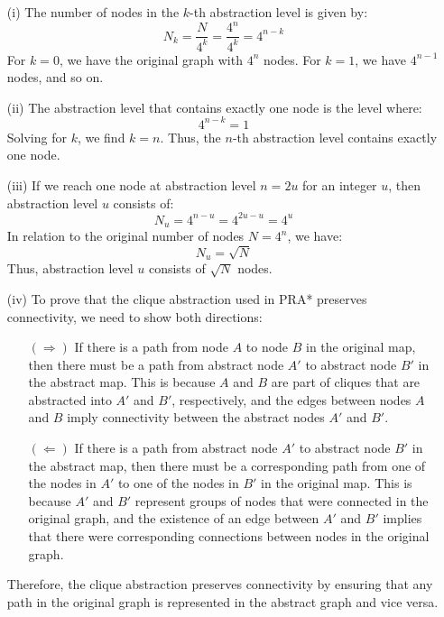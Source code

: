 \documentclass{article}
\begin{document}
\begin{enumerate}
    \item[(i)] The number of nodes in the $k$-th abstraction level is given by:
    \[
    N_k = \frac{N}{4^k} = \frac{4^n}{4^k} = 4^{n-k}
    \]
    For $k = 0$, we have the original graph with $4^n$ nodes. For $k = 1$, we have $4^{n-1}$ nodes, and so on.

    \item[(ii)] The abstraction level that contains exactly one node is the level where:
    \[
    4^{n-k} = 1
    \]
    Solving for $k$, we find $k = n$. Thus, the $n$-th abstraction level contains exactly one node.

    \item[(iii)] If we reach one node at abstraction level $n = 2u$ for an integer $u$, then abstraction level $u$ consists of:
    \[
    N_u = 4^{n-u} = 4^{2u-u} = 4^u
    \]
    In relation to the original number of nodes $N = 4^n$, we have:
    \[
    N_u = \sqrt{N}
    \]
    Thus, abstraction level $u$ consists of $\sqrt{N}$ nodes.

    \item[(iv)] To prove that the clique abstraction used in PRA* preserves connectivity, we need to show both directions:
    
    \begin{itemize}
        \item[$(\Rightarrow)$] If there is a path from node $A$ to node $B$ in the original map, then there must be a path from abstract node $A'$ to abstract node $B'$ in the abstract map. This is because $A$ and $B$ are part of cliques that are abstracted into $A'$ and $B'$, respectively, and the edges between nodes $A$ and $B$ imply connectivity between the abstract nodes $A'$ and $B'$.
        
        \item[$(\Leftarrow)$] If there is a path from abstract node $A'$ to abstract node $B'$ in the abstract map, then there must be a corresponding path from one of the nodes in $A'$ to one of the nodes in $B'$ in the original map. This is because $A'$ and $B'$ represent groups of nodes that were connected in the original graph, and the existence of an edge between $A'$ and $B'$ implies that there were corresponding connections between nodes in the original graph.
    \end{itemize}
    
    Therefore, the clique abstraction preserves connectivity by ensuring that any path in the original graph is represented in the abstract graph and vice versa.
\end{enumerate}
\end{document}
